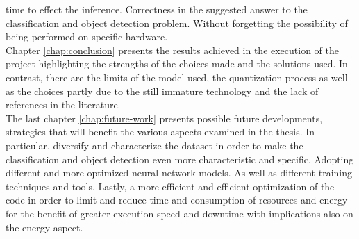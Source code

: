 time to effect the inference. 
Correctness in the suggested answer to the classification and object detection
problem. 
Without forgetting the possibility of being performed on specific hardware.\\
Chapter \ref{chap:conclusion} presents the results achieved in the execution of 
the project highlighting the strengths of the choices made and the solutions
used.
In contrast, there are the limits of the model used, the quantization process as
well as the choices partly due to the still immature technology and the lack of
references in the literature.\\
\noindent The last chapter \ref{chap:future-work} presents possible future
developments, strategies that will benefit the various aspects examined in the
thesis.
In particular, diversify and characterize the dataset in order to make the
classification and object detection even more characteristic and specific.
Adopting different and more optimized neural network models. 
As well as different training techniques and tools.
Lastly, a more efficient and efficient optimization of the code in order to
limit and reduce time and consumption of resources and energy for the benefit of
greater execution speed and downtime with implications also on the energy
aspect.